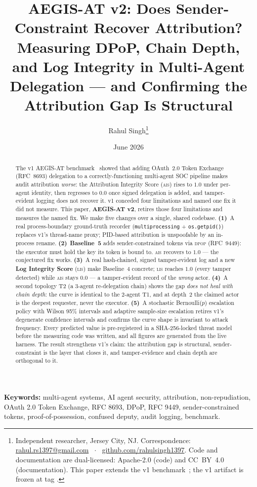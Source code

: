 \documentclass[11pt]{article}
\title{\textbf{AEGIS-AT v2: Does Sender-Constraint Recover Attribution?}\\[4pt]
\large Measuring DPoP, Chain Depth, and Log Integrity in Multi-Agent\\
Delegation --- and Confirming the Attribution Gap Is Structural}
\author{Rahul Singh\thanks{Independent researcher, Jersey City, NJ.
Correspondence: \href{mailto:rahul.rs1397@gmail.com}{rahul.rs1397@gmail.com}
~$\cdot$~ \href{https://github.com/rahulsingh1397}{github.com/rahulsingh1397}.
Code and documentation are dual-licensed: Apache-2.0 (code) and CC~BY~4.0
(documentation). This paper extends the v1 benchmark~\cite{aegisv1}; the v1
artifact is frozen at tag \code{v1.0.0}.}}
\date{June 2026}
\newcommand{\ais}{\textsc{ais}}
\newcommand{\lis}{\textsc{lis}}
\newcommand{\code}[1]{\texttt{#1}}
\newcommand{\dpop}{\textsc{dpop}}
\begin{document}
\maketitle

\begin{abstract}
\noindent
The v1 AEGIS-AT benchmark~\cite{aegisv1} showed that adding OAuth~2.0 Token
Exchange (RFC~8693) delegation to a correctly-functioning multi-agent SOC
pipeline makes audit attribution \emph{worse}: the Attribution Integrity
Score (\ais{}) rises to $1.0$ under per-agent identity, then regresses to
$0.0$ once signed delegation is added, and tamper-evident logging does not
recover it. v1 conceded four limitations and named one fix it did not
measure. This paper, \textbf{AEGIS-AT v2}, retires those four limitations
and measures the named fix. We make five changes over a single, shared
codebase. \textbf{(1)}~A real process-boundary ground-truth recorder
(\code{multiprocessing} + \code{os.getpid()}) replaces v1's thread-name
proxy; PID-based attribution is unspoofable by an in-process rename.
\textbf{(2)}~\textbf{Baseline~5} adds sender-constrained tokens via
\dpop{} (RFC~9449): the executor must hold the key its token is bound to.
\ais{} recovers to $\mathbf{1.0}$ --- the conjectured fix works.
\textbf{(3)}~A real hash-chained, signed tamper-evident log and a new
\textbf{Log Integrity Score} (\lis{}) make Baseline~4 concrete; \lis{}
reaches $1.0$ (every tamper detected) while \ais{} stays $0.0$ --- a
tamper-evident record of the \emph{wrong} actor. \textbf{(4)}~A second
topology T2 (a 3-agent re-delegation chain) shows the gap \emph{does not
heal with chain depth}: the curve is identical to the 2-agent T1, and at
depth~2 the claimed actor is the deepest requester, never the executor.
\textbf{(5)}~A stochastic Bernoulli($p$) escalation policy with Wilson
95\% intervals and adaptive sample-size escalation retires v1's degenerate
confidence intervals and confirms the curve shape is invariant to attack
frequency. Every predicted value is pre-registered in a SHA-256-locked
threat model before the measuring code was written, and all figures are
generated from the live harness. The result strengthens v1's claim: the
attribution gap is structural, sender-constraint is the layer that closes
it, and tamper-evidence and chain depth are orthogonal to it.
\end{abstract}

\noindent\textbf{Keywords:} multi-agent systems, AI agent security,
attribution, non-repudiation, OAuth 2.0 Token Exchange, RFC 8693, DPoP,
RFC 9449, sender-constrained tokens, proof-of-possession, confused deputy,
audit logging, benchmark.
\end{document}
